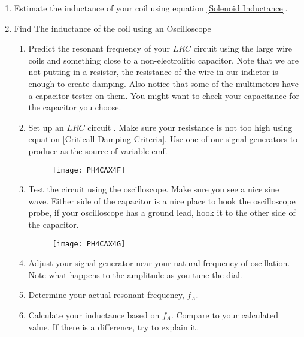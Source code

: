 \begin{enumerate}
	\item Estimate the inductance of your coil using equation \ref{Solenoid Inductance}.

	\item Find The inductance of the coil using an Oscilloscope

	\begin{enumerate}
		\item Predict the resonant frequency of your $LRC$ circuit using the large wire coils and something close to a non-electrolitic capacitor. Note that we are not putting in a resistor, the resistance of the wire in our indictor is enough to create damping. Also notice that some of the multimeters have a capacitor tester on them. You might want to check your capacitance for the capacitor you choose.

		\item Set up an $LRC$ circuit . Make sure your resistance is not too high using equation \ref{Criticall Damping Criteria}. Use one of our signal generators to produce as the source of variable emf. 
		\begin{figure}[h!]
			\centering
			\texttt{[image: PH4CAX4F]}
		\end{figure}

		\item Test the circuit using the oscilloscope. Make sure you see a nice sine wave. Either side of the capacitor is a nice place to hook the oscilloscope probe, if your oscilloscope has a ground lead, hook it to the other side of the capacitor.
		\begin{figure}[h!]
			\centering
			\texttt{[image: PH4CAX4G]}
		\end{figure}

		\item Adjust your signal generator near your natural frequency of oscillation. Note what happens to the amplitude as you tune the dial.

		\item Determine your actual resonant frequency, $f_{A}$.

		\item Calculate your inductance based on $f_{A}$. Compare to your calculated value. If there is a difference, try to explain it.
	\end{enumerate}
\end{enumerate}


\vfill
